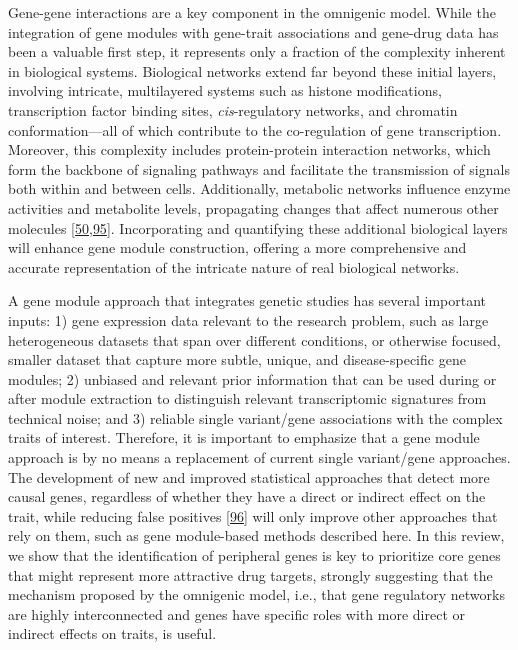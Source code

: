 Gene-gene interactions are a key component in the omnigenic model.
While the integration of gene modules with gene-trait associations and gene-drug data has been a valuable first step, it represents only a fraction of the complexity inherent in biological systems.
Biological networks extend far beyond these initial layers, involving intricate, multilayered systems such as histone modifications, transcription factor binding sites, \emph{cis}-regulatory networks, and chromatin conformation---all of which contribute to the co-regulation of gene transcription.
Moreover, this complexity includes protein-protein interaction networks, which form the backbone of signaling pathways and facilitate the transmission of signals both within and between cells.
Additionally, metabolic networks influence enzyme activities and metabolite levels, propagating changes that affect numerous other molecules {[}\protect\hyperlink{ref-dg9nKuy0}{50},\protect\hyperlink{ref-KNAOTAKP}{95}{]}.
Incorporating and quantifying these additional biological layers will enhance gene module construction, offering a more comprehensive and accurate representation of the intricate nature of real biological networks.

A gene module approach that integrates genetic studies has several important inputs: 1) gene expression data relevant to the research problem, such as large heterogeneous datasets that span over different conditions, or otherwise focused, smaller dataset that capture more subtle, unique, and disease-specific gene modules; 2) unbiased and relevant prior information that can be used during or after module extraction to distinguish relevant transcriptomic signatures from technical noise; and 3) reliable single variant/gene associations with the complex traits of interest.
Therefore, it is important to emphasize that a gene module approach is by no means a replacement of current single variant/gene approaches.
The development of new and improved statistical approaches that detect more causal genes, regardless of whether they have a direct or indirect effect on the trait, while reducing false positives {[}\protect\hyperlink{ref-i8Qjy4pw}{96}{]} will only improve other approaches that rely on them, such as gene module-based methods described here.
In this review, we show that the identification of peripheral genes is key to prioritize core genes that might represent more attractive drug targets, strongly suggesting that the mechanism proposed by the omnigenic model, i.e., that gene regulatory networks are highly interconnected and genes have specific roles with more direct or indirect effects on traits, is useful.

